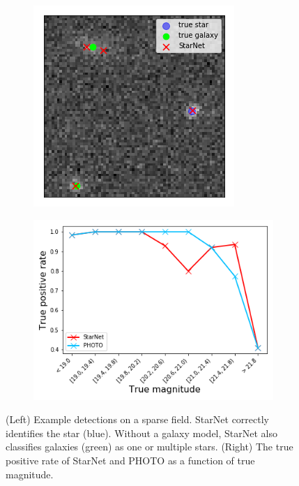 \begin{figure}
    \centering
    \begin{subfigure}{0.45\textwidth}
        \includegraphics[width=\textwidth]{figures/sparse_field/sparse_field_detections.png}
    \end{subfigure}
    \begin{subfigure}{0.54\textwidth}
        \includegraphics[width=\textwidth]{figures/sparse_field/sparse_field_tpr.png}
    \end{subfigure}
    \caption{(Left) Example detections on a sparse field. StarNet correctly identifies the star (blue). 
    Without a galaxy model, StarNet also classifies galaxies (green) as one or multiple stars.
    (Right) The true positive rate of StarNet and PHOTO as a function of true magnitude.}
    \label{fig:sparse_field}
\end{figure}
